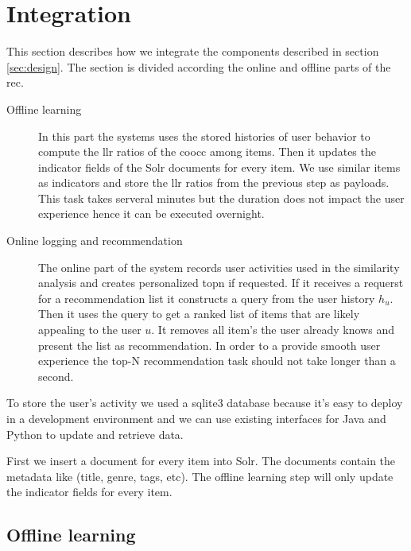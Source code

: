 \section{Integration}
\label{sec:integration}

This section describes how we integrate the components described in section \ref{sec:design}. The section is divided according the online and offline parts of the \gls{rec}.

\begin{description}
\item[Offline learning] In this part the systems uses the stored histories of user behavior to compute the \gls{llr} ratios of the \gls{coocc} among items. Then it updates the indicator fields of the Solr documents for every item. We use similar items as indicators and store the \gls{llr} ratios from the previous step as payloads. This task takes serveral minutes but the duration does not impact the user experience hence it can be executed overnight. 
\item[Online logging and recommendation] The online part of the system records user activities used in the similarity analysis and creates personalized \gls{topn} if requested. If it receives a requerst for a recommendation list it constructs a query from the user history $h_u$. Then it uses the query to get a ranked list of items that are likely appealing to the user $u$. It removes all item's the user already knows and present the list as recommendation. In order to a  provide smooth user experience the top-N recommendation task should not take longer than a second.
\end{description}

To store the user's activity we used a sqlite3 database because it's easy to deploy in a development environment and we can use existing interfaces for Java and Python to update and retrieve data. 

First we insert a document for every item into Solr. The documents contain the metadata like (title, genre, tags, etc). The offline learning step will only update the indicator fields for every item.

\subsection{Offline learning}
\label{sec:offline}

